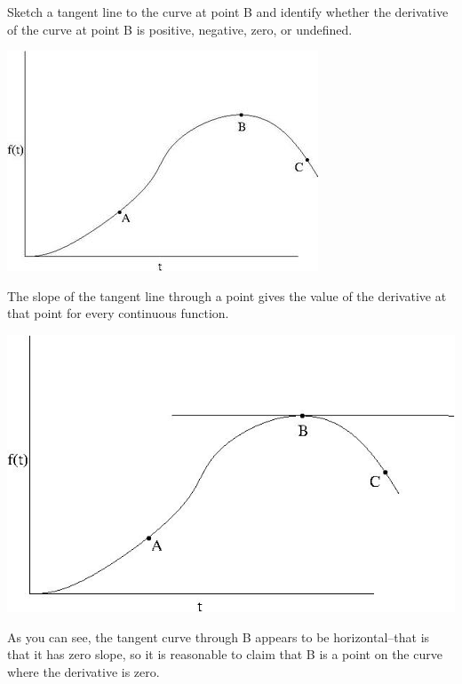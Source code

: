 \documentclass{ximera}
\author{Emma Smith Zbarsky}
\begin{document}
\begin{exercise}

Sketch a tangent line to the curve at point B and identify whether the
derivative of the curve at point B is positive, negative, zero, or
undefined.



\begin{image}\includegraphics{slopedgraph.jpg}\end{image}


\begin{hint}
The slope of the tangent line through a point gives the value of the
derivative at that point for every continuous function.
\end{hint}


\begin{hint}
\begin{image}\includegraphics{slopegraphtangentB.jpg}\end{image}

 As you can see, the tangent curve through
B appears to be horizontal--that is that it has zero slope, so it is
reasonable to claim that B is a point on the curve where the derivative
is zero.
\end{hint}


\begin{multipleChoice}
\end{multipleChoice}

\end{exercise}
\end{document}
